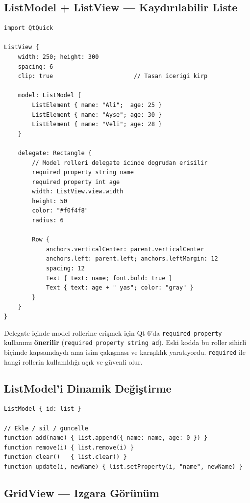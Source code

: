 \documentclass[11pt,a4paper]{article}
\newcommand{\kod}[1]{\texttt{\color{koyuGri}#1}}
\begin{document}
\subsection{ListModel + ListView — Kaydırılabilir Liste}

\begin{lstlisting}
import QtQuick

ListView {
    width: 250; height: 300
    spacing: 6
    clip: true                       // Tasan icerigi kirp

    model: ListModel {
        ListElement { name: "Ali";  age: 25 }
        ListElement { name: "Ayse"; age: 30 }
        ListElement { name: "Veli"; age: 28 }
    }

    delegate: Rectangle {
        // Model rolleri delegate icinde dogrudan erisilir
        required property string name
        required property int age
        width: ListView.view.width
        height: 50
        color: "#f0f4f8"
        radius: 6

        Row {
            anchors.verticalCenter: parent.verticalCenter
            anchors.left: parent.left; anchors.leftMargin: 12
            spacing: 12
            Text { text: name; font.bold: true }
            Text { text: age + " yas"; color: "gray" }
        }
    }
}
\end{lstlisting}

\begin{uyarikutu}
Delegate içinde model rollerine erişmek için Qt 6'da \kod{required property}
kullanımı \textbf{önerilir} (\kod{required property string ad}). Eski kodda bu
roller sihirli biçimde kapsamdaydı ama isim çakışması ve karışıklık yaratıyordu.
\kod{required} ile hangi rollerin kullanıldığı açık ve güvenli olur.
\end{uyarikutu}

\subsection{ListModel'i Dinamik Değiştirme}

\begin{lstlisting}
ListModel { id: list }

// Ekle / sil / guncelle
function add(name) { list.append({ name: name, age: 0 }) }
function remove(i) { list.remove(i) }
function clear()   { list.clear() }
function update(i, newName) { list.setProperty(i, "name", newName) }
\end{lstlisting}

\subsection{GridView — Izgara Görünüm}
\end{document}
